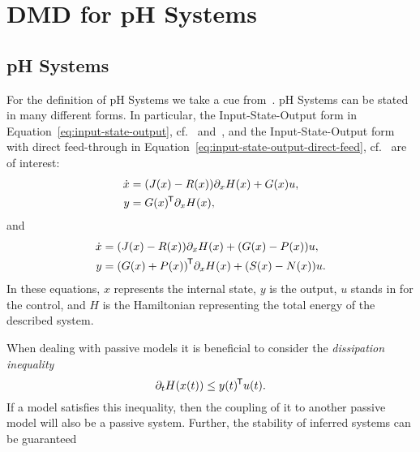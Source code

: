 \section{DMD for pH Systems}


\subsection{pH Systems}

For the definition of pH Systems we take a cue from~\cite{Duindam2009, VanDerSchaft2014, Mehrmann2022}.
pH Systems can be stated in many different forms.
In particular, the Input-State-Output form in Equation~\eqref{eq:input-state-output}, cf.~\cite[Section~2.4]{VanDerSchaft2014} and~\cite[Section~2.2.3]{Duindam2009}, and the Input-State-Output form with direct feed-through in Equation~\eqref{eq:input-state-output-direct-feed}, cf.~\cite[Section~2.2.4]{Duindam2009} are of interest:
\begin{equation}\label{eq:input-state-output}
    \begin{aligned}
        \dot{x} &= (J(x) - R(x)) \partial_x H(x) + G(x) u, \\
        y &= G(x)^{\mkern-1.5mu \mathsf{T}} \partial_x H(x),
    \end{aligned}
\end{equation}
and
\begin{equation}\label{eq:input-state-output-direct-feed}
	\begin{aligned}
        \dot{x} &= (J(x) - R(x)) \partial_x H(x) + (G(x) - P(x)) u , \\
        y &= {(G(x) + P(x))}^{\mkern-1.5mu \mathsf{T}} \partial_x H(x) + (S(x) - N(x)) u.
    \end{aligned}
\end{equation}
In these equations, $x$ represents the internal state, $y$ is the output, $u$ stands in for the control, and $H$ is the Hamiltonian representing the total energy of the described system.

When dealing with passive models it is beneficial to consider the \emph{dissipation inequality}
\begin{equation}
    \partial_t H(x(t)) \leq y(t)^{\mkern-1.5mu \mathsf{T}} u(t).
\end{equation}
If a model satisfies this inequality, then the coupling of it to another passive model will also be a passive system.
Further, the stability of inferred systems can be guaranteed

